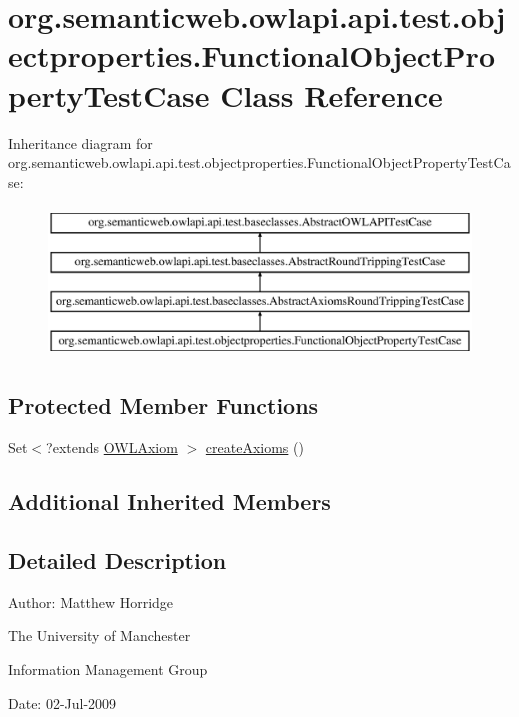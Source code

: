 \hypertarget{classorg_1_1semanticweb_1_1owlapi_1_1api_1_1test_1_1objectproperties_1_1_functional_object_property_test_case}{\section{org.\-semanticweb.\-owlapi.\-api.\-test.\-objectproperties.\-Functional\-Object\-Property\-Test\-Case Class Reference}
\label{classorg_1_1semanticweb_1_1owlapi_1_1api_1_1test_1_1objectproperties_1_1_functional_object_property_test_case}
}
Inheritance diagram for org.\-semanticweb.\-owlapi.\-api.\-test.\-objectproperties.\-Functional\-Object\-Property\-Test\-Case\-:\begin{figure}[H]
\begin{center}
\leavevmode
\includegraphics[height=4.000000cm]{classorg_1_1semanticweb_1_1owlapi_1_1api_1_1test_1_1objectproperties_1_1_functional_object_property_test_case}
\end{center}
\end{figure}
\subsection*{Protected Member Functions}
\begin{DoxyCompactItemize}
\item 
Set$<$?extends \hyperlink{interfaceorg_1_1semanticweb_1_1owlapi_1_1model_1_1_o_w_l_axiom}{O\-W\-L\-Axiom} $>$ \hyperlink{classorg_1_1semanticweb_1_1owlapi_1_1api_1_1test_1_1objectproperties_1_1_functional_object_property_test_case_ac40dbfa54d84503011b230fa346ee41d}{create\-Axioms} ()
\end{DoxyCompactItemize}
\subsection*{Additional Inherited Members}


\subsection{Detailed Description}
Author\-: Matthew Horridge\par
 The University of Manchester\par
 Information Management Group\par
 Date\-: 02-\/\-Jul-\/2009 

